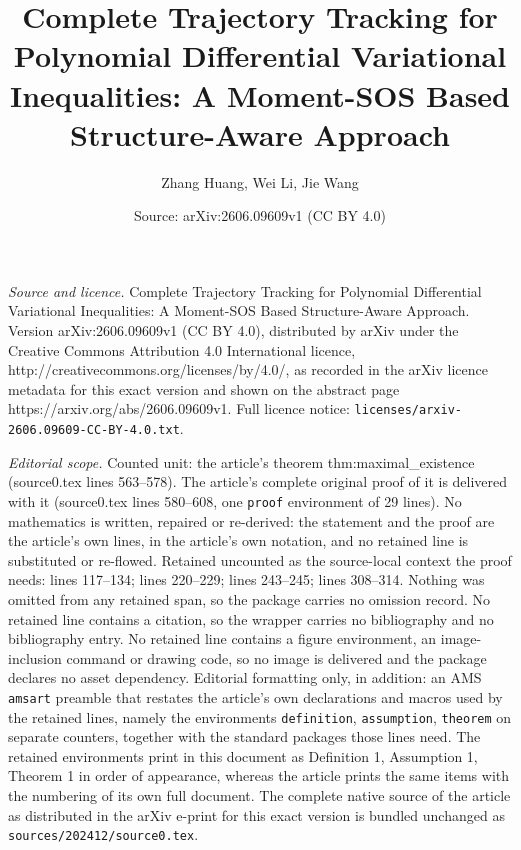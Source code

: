 \documentclass[10pt,a4paper]{amsart}
\title{Complete Trajectory Tracking for Polynomial Differential Variational Inequalities: A Moment-SOS Based Structure-Aware Approach}
\author{Zhang Huang, Wei Li, Jie Wang}
\date{Source: arXiv:2606.09609v1 (CC BY 4.0)}
\begin{document}
\maketitle

\noindent\emph{Source and licence.} Complete Trajectory Tracking for Polynomial Differential Variational Inequalities: A Moment-SOS Based Structure-Aware Approach. Version arXiv:2606.09609v1 (CC BY 4.0), distributed by arXiv under the Creative Commons Attribution 4.0 International licence, http://creativecommons.org/licenses/by/4.0/, as recorded in the arXiv licence metadata for this exact version and shown on the abstract page https://arxiv.org/abs/2606.09609v1. Full licence notice: \texttt{licenses/arxiv-2606.09609-CC-BY-4.0.txt}.\par\smallskip

\noindent\textit{Editorial scope.} Counted unit: the article's theorem thm:maximal\_existence (source0.tex lines 563--578). The article's complete original proof of it is delivered with it (source0.tex lines 580--608, one \texttt{proof} environment of 29 lines). No mathematics is written, repaired or re-derived: the statement and the proof are the article's own lines, in the article's own notation, and no retained line is substituted or re-flowed.  Retained uncounted as the source-local context the proof needs: lines 117--134; lines 220--229; lines 243--245; lines 308--314.  Nothing was omitted from any retained span, so the package carries no omission record.  No retained line contains a citation, so the wrapper carries no bibliography and no bibliography entry.  No retained line contains a figure environment, an image-inclusion command or drawing code, so no image is delivered and the package declares no asset dependency.  Editorial formatting only, in addition: an AMS \texttt{amsart} preamble that restates the article's own declarations and macros used by the retained lines, namely the environments \texttt{definition}, \texttt{assumption}, \texttt{theorem} on separate counters, together with the standard packages those lines need.  The retained environments print in this document as Definition 1, Assumption 1, Theorem 1 in order of appearance, whereas the article prints the same items with the numbering of its own full document.  The complete native source of the article as distributed in the arXiv e-print for this exact version is bundled unchanged as \texttt{sources/202412/source0.tex}.
\end{document}

